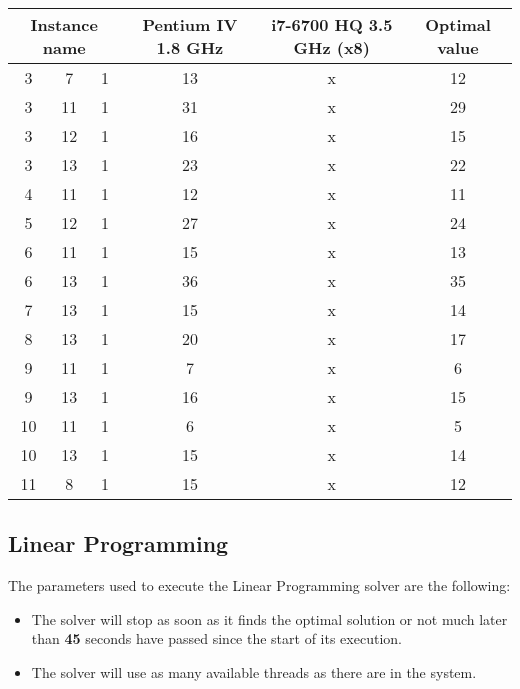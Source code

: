 \begin{table}[H]
\centering
	\begin{tabular}{cccccc}
		\multicolumn{3}{c}{Instance name}
					& Pentium IV 1.8 GHz	& i7-6700 HQ 3.5 GHz (x8)	& Optimal value \\
		\midrule
		 3 &  7 & 1	& 13					&  x						& 12 \\
		 3 & 11 & 1	& 31					&  x						& 29 \\
		 3 & 12 & 1	& 16					&  x						& 15 \\
		 3 & 13 & 1	& 23					&  x						& 22 \\
		 4 & 11 & 1	& 12					&  x						& 11 \\
		 5 & 12 & 1	& 27					&  x						& 24 \\
		 6 & 11 & 1	& 15					&  x						& 13 \\
		 6 & 13 & 1	& 36					&  x						& 35 \\
		 7 & 13 & 1	& 15					&  x						& 14 \\
		 8 & 13 & 1	& 20					&  x						& 17 \\
		 9 & 11 & 1	& 7						&  x						& 6 \\
		 9 & 13 & 1	& 16					&  x						& 15 \\
		10 & 11 & 1	& 6						&  x						& 5 \\
		10 & 13 & 1	& 15					&  x						& 14 \\
		11 &  8 & 1	& 15					&  x						& 12 \\
	\end{tabular}
	\label{table:CP-results:suboptimalinstances}
\end{table}

\subsection{Linear Programming}
\label{sec:benchmarking:linear-programming}

The parameters used to execute the Linear Programming solver are the following:
\begin{itemize}
	\item The solver will stop as soon as it finds the optimal solution or not much
	later than \textbf{45} seconds have passed since the start of its execution.
	\item The solver will use as many available threads as there are in the system.
\end{itemize}

